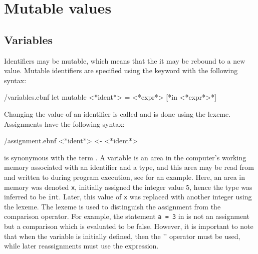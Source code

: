 \documentclass[fsharpNotes.tex]{subfiles}
\begin{document}
\chapter{Mutable values}
\section{Variables}
\label{sec:mutableValues}
Identifiers may be mutable, which means that the it may be rebound to a new value. Mutable identifiers are specified using the  keyword with the following syntax:
%
\begin{verbatimwrite}{\ebnf/variables.ebnf}
let mutable <*ident*> = <*expr*> [*in <*expr*>*]
\end{verbatimwrite}
%
Changing the value of an identifier is called  and is done using the \idx[{<-}@\lstinline{<-}]{\lexeme{<-}} lexeme. Assignments have the following syntax:
%
\begin{verbatimwrite}{\ebnf/assignment.ebnf}
<*ident*> <- <*ident*>
\end{verbatimwrite}
%
 is synonymous with the term . A variable is an area in the computer's working memory associated with an identifier and a type, and this area may be read from and written to during program execution, see  for an example.
%
%
Here, an area in memory was denoted \lstinline{x}, initially assigned the integer value 5, hence the type was inferred to be \lstinline|int|.  Later, this value of \lstinline{x} was replaced with another integer using the \lexeme{<-} lexeme. The \lexeme{<-} lexeme is used to distinguish the assignment from the comparison operator. For example, the statement \lstinline{a = 3} in  is not an assignment but a comparison which is evaluated to be false. 
%
%
%
However, it is important to note that when the variable is initially defined, then the '\lexeme{=}' operator must be used, while later reassignments must use the \lexeme{<-} expression.
\end{document}
